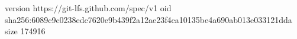 version https://git-lfs.github.com/spec/v1
oid sha256:6089c9c0238edc7620e9b439f2a12ae23f4ca10135be4a690ab013e033121dda
size 174916

